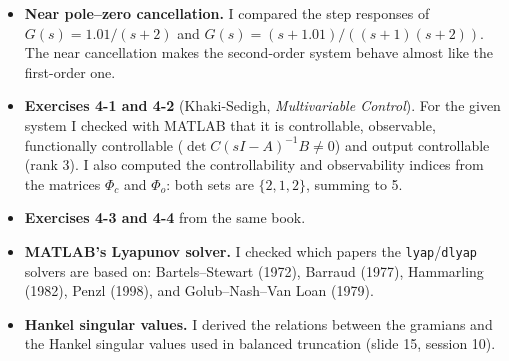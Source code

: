 


\begin{itemize}
  \item \textbf{Near pole--zero cancellation.} I compared the step responses of $G(s)=1.01/(s+2)$ and $G(s)=(s+1.01)/((s+1)(s+2))$. The near cancellation makes the second-order system behave almost like the first-order one.
  \item \textbf{Exercises 4-1 and 4-2} (Khaki-Sedigh, \emph{Multivariable Control}). For the given system I checked with MATLAB that it is controllable, observable, functionally controllable ($\det C(sI-A)^{-1}B\neq 0$) and output controllable (rank 3). I also computed the controllability and observability indices from the matrices $\Phi_c$ and $\Phi_o$: both sets are $\{2,1,2\}$, summing to 5.
  \item \textbf{Exercises 4-3 and 4-4} from the same book.
  \item \textbf{MATLAB's Lyapunov solver.} I checked which papers the \texttt{lyap}/\texttt{dlyap} solvers are based on: Bartels--Stewart (1972), Barraud (1977), Hammarling (1982), Penzl (1998), and Golub--Nash--Van Loan (1979).
  \item \textbf{Hankel singular values.} I derived the relations between the gramians and the Hankel singular values used in balanced truncation (slide 15, session 10).
\end{itemize}

